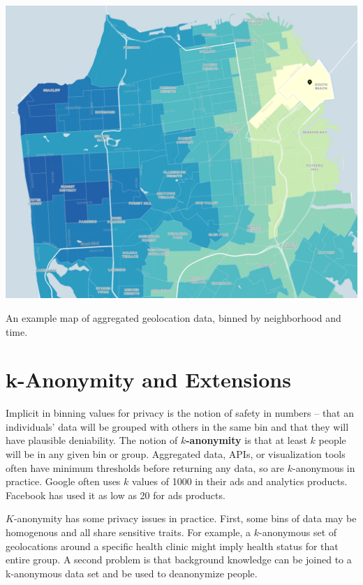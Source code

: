 \documentclass[nobib]{tufte-handout}
\begin{document}
\begin{marginfigure} \includegraphics[width=\linewidth]{binned}
\caption{An example map of aggregated geolocation data, binned by neighborhood
and time.}
\label{fig:binned} \end{marginfigure}


\section{k-Anonymity and Extensions}

Implicit in binning values for privacy is the notion of safety in numbers --
that an individuals’ data will be grouped with others in the same bin and that
they will have plausible deniability. The notion of \textbf{$k$-anonymity}
\cite{DBLP:journals/ijufks/Sweene02} is that at least $k$ people will be in any
given bin or group. Aggregated data, APIs, or visualization tools often have
minimum thresholds before returning any data, so are $k$-anonymous in practice.
Google often uses $k$ values of 1000 in their ads and analytics
products. Facebook has used it as low as 20 for ads products.

$K$-anonymity has some privacy issues in practice. First, some bins of data may be
homogenous and all share sensitive traits. For example, a $k$-anonymous set of
geolocations around a specific health clinic might imply health status for that
entire group. A second problem is that background knowledge can be joined to a
k-anonymous data set and be used to deanonymize people.
\end{document}
